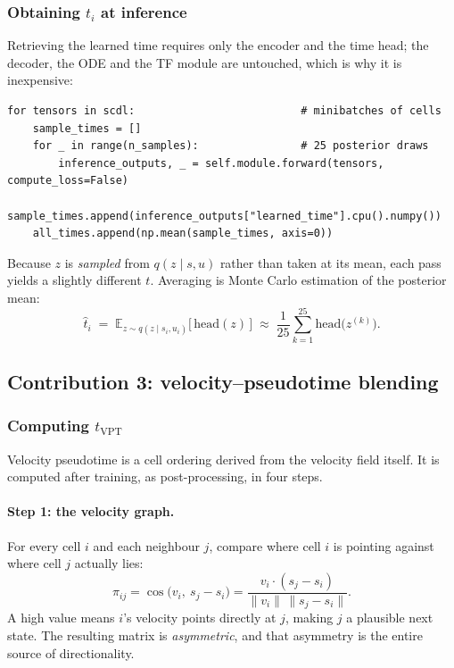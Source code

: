 \documentclass[11pt,a4paper]{article}
\newcommand{\uns}{u}
\newcommand{\spl}{s}
\newcommand{\E}{\mathbb{E}}
\theoremstyle{definition}
\begin{document}
\subsubsection{Obtaining \texorpdfstring{$t_i$}{t\_i} at inference}

Retrieving the learned time requires only the encoder and the time head; the
decoder, the ODE and the TF module are untouched, which is why it is
inexpensive:

\begin{lstlisting}
for tensors in scdl:                          # minibatches of cells
    sample_times = []
    for _ in range(n_samples):                # 25 posterior draws
        inference_outputs, _ = self.module.forward(tensors, compute_loss=False)
        sample_times.append(inference_outputs["learned_time"].cpu().numpy())
    all_times.append(np.mean(sample_times, axis=0))
\end{lstlisting}

Because $z$ is \emph{sampled} from $q(z \mid \spl, \uns)$ rather than taken at its
mean, each pass yields a slightly different $t$. Averaging is Monte Carlo
estimation of the posterior mean:
%
\begin{equation}
\hat{t}_i \;=\; \E_{z \sim q(z \mid \spl_i, \uns_i)}\big[\,\mathrm{head}(z)\,\big]
\;\approx\; \frac{1}{25}\sum_{k=1}^{25} \mathrm{head}\big(z^{(k)}\big).
\end{equation}

\subsection{Contribution 3: velocity--pseudotime blending}

\subsubsection{Computing \texorpdfstring{$t_{\text{VPT}}$}{t\_VPT}}

Velocity pseudotime is a cell ordering derived from the velocity field itself.
It is computed after training, as post-processing, in four steps.

\paragraph{Step 1: the velocity graph.} For every cell $i$ and each neighbour
$j$, compare where cell $i$ is pointing against where cell $j$ actually lies:
%
\begin{equation}
\pi_{ij} = \cos\big(v_i,\ \spl_j - \spl_i\big)
= \frac{v_i \cdot (\spl_j - \spl_i)}{\lVert v_i \rVert\, \lVert \spl_j - \spl_i \rVert}.
\end{equation}
%
A high value means $i$'s velocity points directly at $j$, making $j$ a
plausible next state. The resulting matrix is \emph{asymmetric}, and that
asymmetry is the entire source of directionality.
\end{document}
